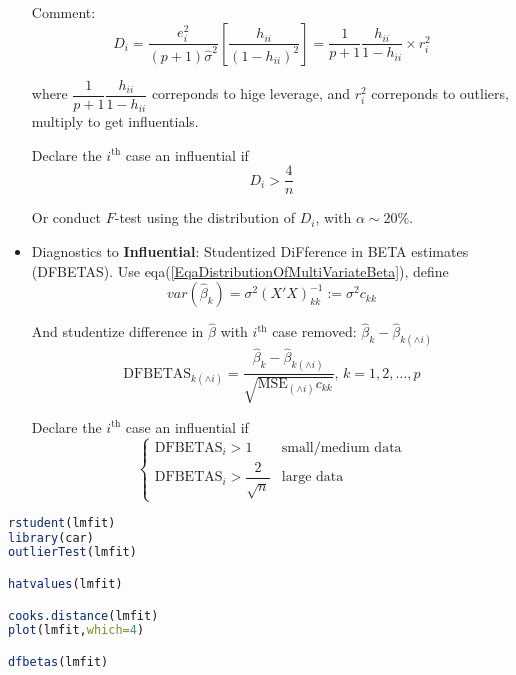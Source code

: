 \begin{itemize}[topsep=2pt,itemsep=0pt]
    Comment:
    \begin{equation}
        D_i=\dfrac{e_i^2}{(p+1)\hat{\sigma }^2}\left[ \dfrac{h_{ii}}{(1-h_{ii})^2} \right]=\dfrac{1}{p+1}\dfrac{h_{ii}}{1-h_{ii}}\times r_i^2
    \end{equation}

   where $ \dfrac{1}{p+1}\dfrac{h_{ii}}{1-h_{ii}} $ correponds to hige leverage, and $ r_{i}^2 $ correponds to outliers, multiply to get influentials.

   Declare the $ i^\mathrm{th}  $ case an {influential} if 
   \[
       D_i>\dfrac{4}{n}
   \]
   
   Or conduct $ F $-test using the distribution of $ D_i $, with $ \alpha \sim 20\% $. 

   \item Diagnostics to \textbf{Influential}: Studentized DiFference in BETA estimates (DFBETAS). Use eqa(\ref{EqaDistributionOfMultiVariateBeta}), define
   \[
       var(\hat{\beta }_k)=\sigma ^2(X'X)^{-1}_{kk}:=\sigma ^2c_{kk} 
   \]
   
   And studentize difference in $ \hat{\beta } $ with $ i^\mathrm{th} $ case removed: $ \hat{\beta }_k-\hat{\beta }_{k(\wedge i)} $
   \[
       \mathrm{DFBETAS}_{k(\wedge i)}=\dfrac{\hat{\beta }_k-\hat{\beta }_{k(\wedge i)}}{\sqrt{\mathrm{MSE}_{(\wedge i)}c_{kk} }},\,k=1,2,\ldots, p
   \]
   
   Declare the $ i^\mathrm{th}  $ case an {influential} if 
   \[
    \begin{cases}
        \mathrm{DFBETAS}_i>1&\text{small/medium data} \\
        \mathrm{DFBETAS}_i>\dfrac{2}{\sqrt{n}}&\text{large data}
    \end{cases}   
   \]
   
   
   
   

\end{itemize}

    
 


\begin{rcode}
\begin{lstlisting}[language=R]
rstudent(lmfit)
library(car)
outlierTest(lmfit)

hatvalues(lmfit)

cooks.distance(lmfit)
plot(lmfit,which=4)

dfbetas(lmfit)
\end{lstlisting}
\end{rcode}


















